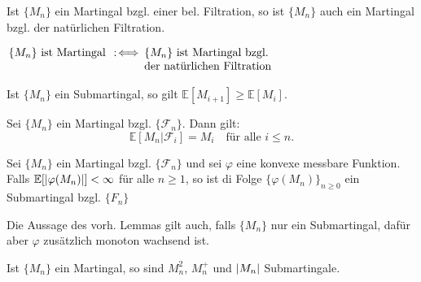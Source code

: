 \documentclass{cheat-sheet}
\newcommand{\E}{\mathbb{E}} %
\newcommand{\Filt}{\mathcal{F}} %
\begin{document}
\begin{lem}
  Ist $\{ M_n \}$ ein Martingal bzgl. einer bel. Filtration, so ist $\{ M_n \}$ auch ein Martingal bzgl. der natürlichen Filtration.
\end{lem}

\begin{defn}
  $
    \arraycolsep=1pt
    \begin{array}[t]{r c l}
      \{ M_n \} \text{ ist Martingal} & \coloniff & \{ M_n \} \text{ ist Martingal bzgl.} \\
      && \text{der natürlichen Filtration}
    \end{array}
  $
\end{defn}

\begin{lem}
  Ist $\{ M_n \}$ ein Submartingal, so gilt $\E[ M_{i+1} ] \geq \E[M_i]$.
\end{lem}

\begin{lem}
  Sei $\{ M_n \}$ ein Martingal bzgl. $\{ \Filt_n \}$.
  Dann gilt:
  \[
    \E[M_n | \Filt_i] = M_i
    \quad \text{für alle $i \leq n$.}
  \]
\end{lem}

\begin{lem}
  Sei $\{ M_n \}$ ein Martingal bzgl. $\{ \Filt_n \}$ und sei $\varphi$ eine konvexe messbare Funktion.
  Falls $\E [\abs{\varphi(M_n)}] < \infty$ für alle $n \geq 1$, so ist di Folge $\{ \varphi(M_n) \}_{n \geq 0}$ ein Submartingal bzgl. $\{ F_n \}$
\end{lem}

\begin{bem}
  Die Aussage des vorh. Lemmas gilt auch, falls $\{ M_n \}$ nur ein Submartingal, dafür aber $\varphi$ zusätzlich monoton wachsend ist.
\end{bem}

\begin{bsp}
  Ist $\{ M_n \}$ ein Martingal, so sind $M_n^2$, $M_n^{+}$ und $\lvert M_n\rvert$ Submartingale.
\end{bsp}
\end{document}
